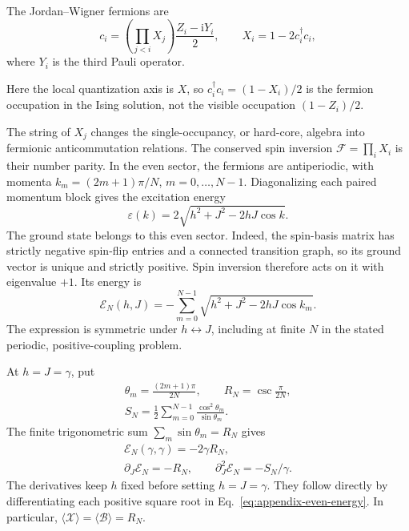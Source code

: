 \documentclass[aps,pre,reprint,amsmath,amssymb,longbibliography,floatfix]{revtex4-2}
\begin{document}
The Jordan--Wigner fermions are
\begin{equation}
 c_i=\left(\prod_{j<i}X_j\right)\frac{Z_i-\mathrm iY_i}{2},
 \qquad X_i=1-2c_i^\dagger c_i,
\end{equation}
where $Y_i$ is the third Pauli operator.

Here the local quantization axis is $X$, so $c_i^\dagger c_i=(1-X_i)/2$
is the fermion occupation in the Ising solution, not the visible
occupation $(1-Z_i)/2$.

 The string of $X_j$ changes the single-occupancy, or hard-core,  algebra into fermionic anticommutation relations. The conserved spin inversion
$\mathcal F=\prod_iX_i$ is their number parity. In the even sector,
the fermions are antiperiodic, with momenta
$k_m=(2m+1)\pi/N$, $m=0,\ldots,N-1$.
Diagonalizing each paired momentum block gives the excitation energy
\begin{equation}
 \varepsilon(k)=2\sqrt{h^2+J^2-2hJ\cos k}.
 \label{eq:appendix-dispersion}
\end{equation}
The ground state belongs to this even sector. Indeed, the spin-basis
matrix has strictly negative spin-flip entries and a connected transition
graph, so its ground vector is unique and strictly positive. Spin inversion
therefore acts on it with eigenvalue $+1$. Its energy is
\begin{equation}
 \mathcal E_N(h,J)
 =-\sum_{m=0}^{N-1}\sqrt{h^2+J^2-2hJ\cos k_m}.
 \label{eq:appendix-even-energy}
\end{equation}
The expression is symmetric under $h\leftrightarrow J$, including at
finite $N$ in the stated periodic, positive-coupling problem.

At $h=J=\gamma$, put
\begin{equation}
 \begin{gathered}
 \theta_m=\frac{(2m+1)\pi}{2N},\qquad R_N=\csc\frac{\pi}{2N},\\
 S_N=\frac12\sum_{m=0}^{N-1}\frac{\cos^2\theta_m}{\sin\theta_m}.
 \end{gathered}
 \label{eq:appendix-critical-sums}
\end{equation}
The finite trigonometric sum $\sum_m\sin\theta_m=R_N$ gives
\begin{equation}
 \begin{gathered}
 \mathcal E_N(\gamma,\gamma)=-2\gamma R_N,\\
 \partial_J\mathcal E_N=-R_N,\qquad
 \partial_J^2\mathcal E_N=-S_N/\gamma.
 \end{gathered}
 \label{eq:appendix-critical-derivatives}
\end{equation}
The derivatives keep $h$ fixed before setting $h=J=\gamma$.
They follow directly by differentiating each positive square root in
Eq.~\eqref{eq:appendix-even-energy}. In particular,
$\langle\mathcal X\rangle=\langle\mathcal B\rangle=R_N$.
\end{document}
